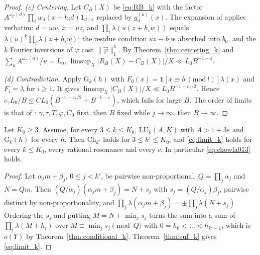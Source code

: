 \begin{proof}
\emph{(c) Centering.} Let $C_B(X)$ be \eqref{eq:RB_k} with the factor $A^{\omega_{\mathcal C}(d)}\prod_iw_d(x+h_id)\mathbf 1_{d\mid x}$ replaced by $g^{(k)}_d(x)$. The expansion of \cite[\S12.1]{OpenAI2026} applies verbatim: $d=uw$, $x=uz$, and $\prod_i\lambda(u(z+h_iw))$ equals $\lambda(u)^k\prod_i\lambda(z+h_iw)$; the residue condition $uz\equiv b$ is absorbed into $b_0$, and the $k$ Fourier inversions of $\varphi$ cost $\|\widehat\varphi\|_1^k$. By Theorem~\ref{thm:centering_k} and $\sum_uA^{\omega_{\mathcal C}(u)}/u=L_0$, $\limsup_X|R_B(X)-C_B(X)|/X\ll L_0B^{-1-\varepsilon}$.

\emph{(d) Contradiction.} Apply $\mathrm{G}_k(h)$ with $F_0(x)=\mathbf 1[x\equiv b\ (\mathrm{mod}\ l)]\lambda(x)$ and $F_i=\lambda$ for $i\ge1$. It gives $\limsup_X|C_B(X)|/X\ll L_0B^{-1-c_*/2}$. Hence $c_\gamma L_0/B\le C L_0(B^{-1-c_*/2}+B^{-1-\varepsilon})$, which fails for large $B$. The order of limits is that of \cite[p.~49]{OpenAI2026}: $\gamma,\tau,T,\varphi,C_0$ first, then $B$ fixed while $j\to\infty$, then $B\to\infty$.
\end{proof}

\begin{corollary}
\label{cor:family_conditional}
Let $K_0\ge3$. Assume, for every $3\le k\le K_0$, $\mathrm{LU}_k(A,K)$ with $A>1+3\varepsilon$ and $\mathrm{G}_k(h)$ for every $h$. Then $\mathrm{Ch}_{k'}$ holds for $3\le k'\le K_0$, and \eqref{eq:limit_k} holds for every $k\le K_0$, every rational resonance and every $c$. In particular \eqref{eq:chowla013} holds.
\end{corollary}

\begin{proof}
Let $\alpha_jm+\beta_j$, $0\le j<k'$, be pairwise non-proportional, $Q=\prod_j\alpha_j$ and $N=Qm$. Then $(Q/\alpha_j)(\alpha_jm+\beta_j)=N+s_j$ with $s_j=(Q/\alpha_j)\beta_j$, pairwise distinct by non-proportionality, and $\prod_j\lambda(\alpha_jm+\beta_j)=\pm\prod_j\lambda(N+s_j)$. Ordering the $s_j$ and putting $M=N+\min_js_j$ turns the sum into a sum of $\prod_i\lambda(M+h_i)$ over $M\equiv\min_js_j\pmod Q$ with $0=h_0<\dots<h_{k'-1}$, which is $o(Y)$ by Theorem~\ref{thm:conditional_k}. Theorem~\ref{thm:suf_k} gives \eqref{eq:limit_k}.
\end{proof}

